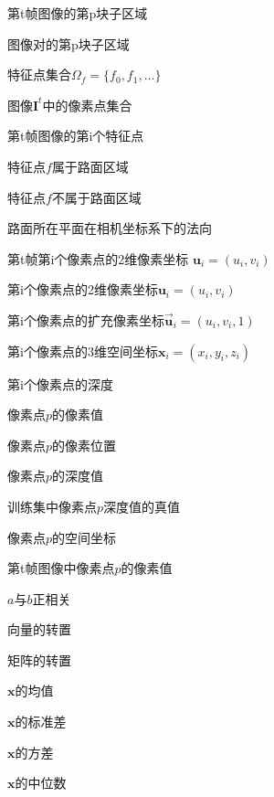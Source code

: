 \item[$^p\mathbf{I}^t$] 第t帧图像的第p块子区域
\item[$^p\mathbf{I}_m^n$] 图像对的第p块子区域
\item[$\Omega_f$]  特征点集合$\Omega_f=\{f_0,f_1,...\}$
\item[$\Omega_{\mathbf{I}^t}$]  图像$\mathbf{I}^t$中的像素点集合 
\item[$f^t_i$] 第t帧图像的第i个特征点
\item[$\check{f}$] 特征点$f$属于路面区域
\item[$\hat{f}$] 特征点$f$不属于路面区域
\item[$\mathbf{n}_r$] 路面所在平面在相机坐标系下的法向  
\item[$\mathbf{u}^t_i$] 第t帧第i个像素点的2维像素坐标 $\mathbf{u}_i=(u_i,v_i)$
\item[$\mathbf{u}_i$] 第i个像素点的2维像素坐标$\mathbf{u}_i=(u_i,v_i)$ 
\item[$\vec{\mathbf{u}}_i$] 第i个像素点的扩充像素坐标$\vec{\mathbf{u}}_i=(u_i,v_i,1)$ 
\item[$\mathbf{x}_i$] 第i个像素点的3维空间坐标$\mathbf{x}_i=(x_i,y_i,z_i)$
\item[$d_i$] 第i个像素点的深度
\item[$I_p$] 像素点$p$的像素值
\item[$\mathbf{u}_p$] 像素点$p$的像素位置
\item[$d_p$] 像素点$p$的深度值
\item[$\underline{d_p}$] 训练集中像素点$p$深度值的真值
\item[$\mathbf{x}_p$] 像素点$p$的空间坐标 
\item[$I^t_p$] 第t帧图像中像素点$p$的像素值
\item[$a \propto b $] $a$与$b$正相关
\item[$\mathbf{v}^\text{T}$] 向量的转置
\item[$\mathbf{M}^\text{T}$] 矩阵的转置 
\item[$\mu(\mathbf{x})$] $\mathbf{x}$的均值 
\item[$\sigma(\mathbf{x})$] $\mathbf{x}$的标准差
\item[$\sigma^2(\mathbf{x})$] $\mathbf{x}$的方差  
\item[$Q_{\frac{1}{2}}(\mathbf{x})$] $\mathbf{x}$的中位数